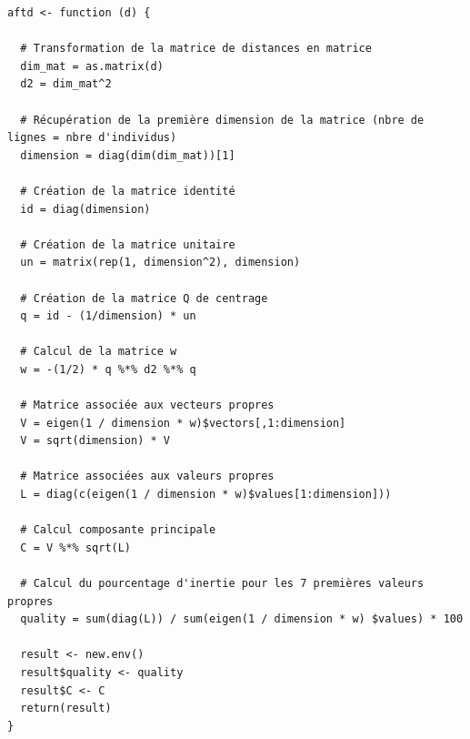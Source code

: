 \documentclass[a4paper, 10pt]{article}
\begin{document}
\begin{verbatim}
aftd <- function (d) {

  # Transformation de la matrice de distances en matrice
  dim_mat = as.matrix(d)
  d2 = dim_mat^2

  # Récupération de la première dimension de la matrice (nbre de lignes = nbre d'individus)
  dimension = diag(dim(dim_mat))[1]

  # Création de la matrice identité
  id = diag(dimension)

  # Création de la matrice unitaire
  un = matrix(rep(1, dimension^2), dimension)

  # Création de la matrice Q de centrage
  q = id - (1/dimension) * un

  # Calcul de la matrice w
  w = -(1/2) * q %*% d2 %*% q

  # Matrice associée aux vecteurs propres
  V = eigen(1 / dimension * w)$vectors[,1:dimension]
  V = sqrt(dimension) * V

  # Matrice associées aux valeurs propres
  L = diag(c(eigen(1 / dimension * w)$values[1:dimension]))

  # Calcul composante principale
  C = V %*% sqrt(L)

  # Calcul du pourcentage d'inertie pour les 7 premières valeurs propres
  quality = sum(diag(L)) / sum(eigen(1 / dimension * w) $values) * 100

  result <- new.env()
  result$quality <- quality
  result$C <- C
  return(result)
}

\end{verbatim}

\newpage
\end{document}
